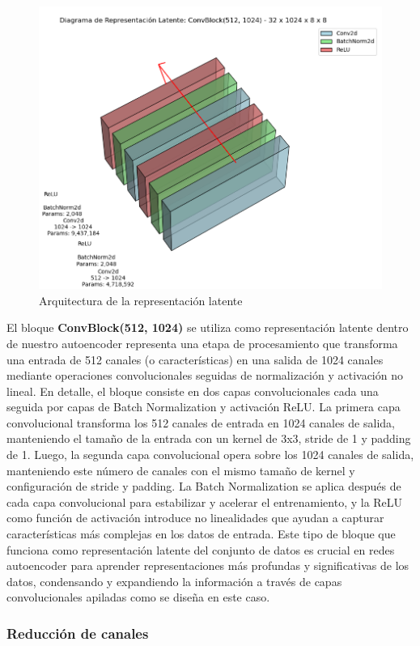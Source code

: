 \begin{figure}[H]
	\centering
	\includegraphics[width=0.8\linewidth]{imagenes/bottleneck_arch.png}
	\caption{Arquitectura de la representación latente}
\end{figure}

El bloque \textbf{ConvBlock(512, 1024)} se utiliza como representación latente dentro de nuestro autoencoder representa una etapa de procesamiento que transforma una entrada de 512 canales (o características) en una salida de 1024 canales mediante operaciones convolucionales seguidas de normalización y activación no lineal. En detalle, el bloque consiste en dos capas convolucionales cada una seguida por capas de Batch Normalization y activación ReLU. La primera capa convolucional transforma los 512 canales de entrada en 1024 canales de salida, manteniendo el tamaño de la entrada con un kernel de 3x3, stride de 1 y padding de 1. Luego, la segunda capa convolucional opera sobre los 1024 canales de salida, manteniendo este número de canales con el mismo tamaño de kernel y configuración de stride y padding. La Batch Normalization se aplica después de cada capa convolucional para estabilizar y acelerar el entrenamiento, y la ReLU como función de activación introduce no linealidades que ayudan a capturar características más complejas en los datos de entrada. Este tipo de bloque que funciona como representación latente del conjunto de datos es crucial en redes autoencoder para aprender representaciones más profundas y significativas de los datos, condensando y expandiendo la información a través de capas convolucionales apiladas como se diseña en este caso.

\subsubsection{Reducción de canales}

